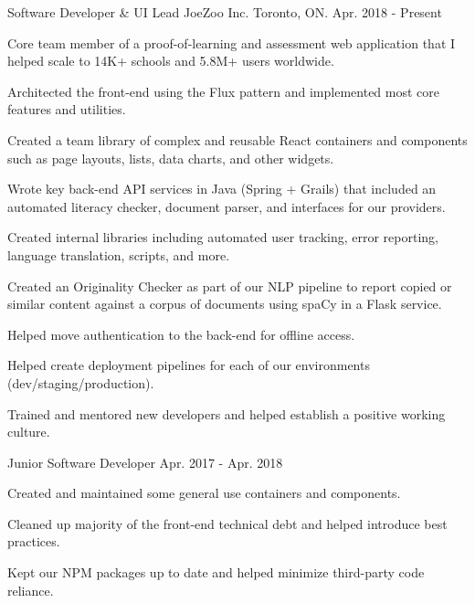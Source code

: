 

\begin{cventries}

  \cventry
  {Software Developer \& UI Lead} %
  {JoeZoo Inc.} %
  {Toronto, ON.} %
  {Apr. 2018 - Present} %
  {
    \begin{cvitems} %
      \item {Core team member of a proof-of-learning and assessment web application that I helped scale to 14K+ schools and 5.8M+ users worldwide.}
      \item {Architected the front-end using the Flux pattern and implemented most core features and utilities.}
      \item {Created a team library of complex and reusable React containers and components such as page layouts, lists, data charts, and other widgets.}
      \item {Wrote key back-end API services in Java (Spring + Grails) that included an automated literacy checker, document parser, and interfaces for our providers.}
      \item {Created internal libraries including automated user tracking, error reporting, language translation, scripts, and more.}
      \item {Created an Originality Checker as part of our NLP pipeline to report copied or similar content against a corpus of documents using spaCy in a Flask service.}
      \item {Helped move authentication to the back-end for offline access.}
      \item {Helped create deployment pipelines for each of our environments (dev/staging/production).}
      \item {Trained and mentored new developers and helped establish a positive working culture.}
    \end{cvitems}
  }


  \cventry
    {Junior Software Developer}
    {} %
    {} %
    {Apr. 2017 - Apr. 2018} %
    {
      \begin{cvitems}
        \item {Created and maintained some general use containers and components.}
        \item {Cleaned up majority of the front-end technical debt and helped introduce best practices.}
        \item {Kept our NPM packages up to date and helped minimize third-party code reliance.}
      \end{cvitems}
 	  }


\end{cventries}
